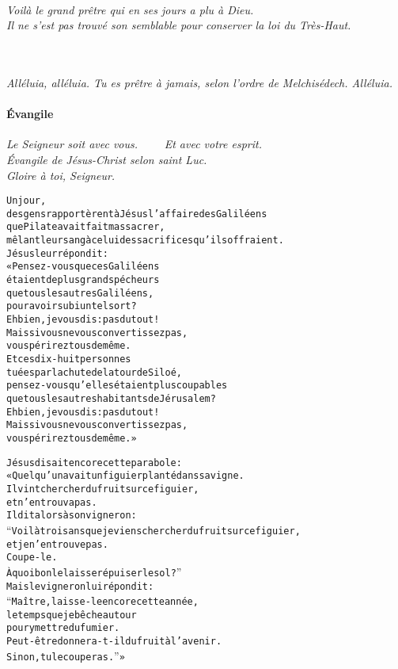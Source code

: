 \documentclass[twoside]{article}
\begin{document}
\\
\emph{\rr Voilà le grand prêtre qui en ses jours a plu à Dieu.\\
\vv Il ne s’est pas trouvé son semblable pour conserver la loi du Très-Haut.}\\
~\\

\\
\emph{Alléluia, alléluia. Tu es prêtre à jamais, selon l'ordre de Melchisédech. Alléluia.}

\paragraph{Évangile}

\emph{\vv Le Seigneur soit avec vous. ~~~~\rr Et avec votre esprit.\\
\vv Évangile de Jésus-Christ selon saint Luc. \\
\rr Gloire à toi, Seigneur.}

\begin{alltt}\normalfont
    Un jour,
        des gens rapportèrent à Jésus l’affaire des Galiléens
        que Pilate avait fait massacrer,
        mêlant leur sang à celui des sacrifices qu’ils offraient.
    Jésus leur répondit :
    « Pensez-vous que ces Galiléens
        étaient de plus grands pécheurs
        que tous les autres Galiléens,
        pour avoir subi un tel sort ?
    Eh bien, je vous dis : pas du tout !
    Mais si vous ne vous convertissez pas,
        vous périrez tous de même.
    Et ces dix-huit personnes
        tuées par la chute de la tour de Siloé,
        pensez-vous qu’elles étaient plus coupables
        que tous les autres habitants de Jérusalem ?
    Eh bien, je vous dis : pas du tout !
    Mais si vous ne vous convertissez pas,
        vous périrez tous de même. »

    Jésus disait encore cette parabole :
    « Quelqu’un avait un figuier planté dans sa vigne.
    Il vint chercher du fruit sur ce figuier,
        et n’en trouva pas.
    Il dit alors à son vigneron :
    “Voilà trois ans que je viens chercher du fruit sur ce figuier,
        et je n’en trouve pas.
     Coupe-le.
    À quoi bon le laisser épuiser le sol ?”
    Mais le vigneron lui répondit :
    “Maître, laisse-le encore cette année,
        le temps que je bêche autour
        pour y mettre du fumier.
    Peut-être donnera-t-il du fruit à l’avenir.
    Sinon, tu le couperas.” »
\end{alltt}
\end{document}
